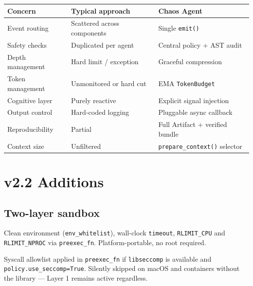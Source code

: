 \documentclass[11pt, a4paper]{article}
\begin{document}
\begin{center}
\begin{tabularx}{\linewidth}{@{} l X X @{}}
  \toprule
  \sffamily\bfseries Concern
    & \sffamily\bfseries Typical approach
    & \sffamily\bfseries Chaos Agent \\
  \midrule
  Event routing    & Scattered across components       & Single \texttt{emit()} \\
  Safety checks    & Duplicated per agent              & Central policy + AST audit \\
  Depth management & Hard limit / exception            & Graceful compression \\
  Token management & Unmonitored or hard cut           & EMA \texttt{TokenBudget} \\
  Cognitive layer  & Purely reactive                   & Explicit signal injection \\
  Output control   & Hard-coded logging                & Pluggable async callback \\
  Reproducibility  & Partial                           & Full Artifact + verified bundle \\
  Context size     & Unfiltered                        & \texttt{prepare\_context()} selector \\
  \bottomrule
\end{tabularx}
\end{center}

\section{v2.2 Additions}

\subsection{Two-layer sandbox}


\begin{description}[style=nextline, leftmargin=0pt]
  \item[Layer 1 — subprocess (always active)]
    Clean environment (\texttt{env\_whitelist}), wall-clock \texttt{timeout},
    \texttt{RLIMIT\_CPU} and \texttt{RLIMIT\_NPROC} via \texttt{preexec\_fn}.
    Platform-portable, no root required.
  \item[Layer 2 — seccomp-bpf (optional)]
    Syscall allowlist applied in \texttt{preexec\_fn} if \texttt{libseccomp}
    is available and \texttt{policy.use\_seccomp=True}.
    Silently skipped on macOS and containers without the library —
    Layer 1 remains active regardless.
\end{description}
\end{document}

